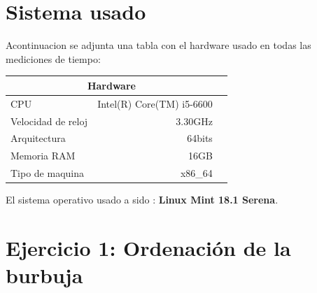 \documentclass[12pt,a4psprt]{article}
\title{\fbox{\fbox{\bf Práctica 1: Eficiencia}}}
\author{Antonio Jesús Heredia Castillo\\ 2ºA \\ ETS de Ingenierías Informática y de Telecomunicación }
\date{\today}
\begin{document}
\maketitle{}
	
\begin{abstract}
En esta practica obtendremos datos sobre el tiempo de ejecucion de distintos algoritmos y como afecta la compilacion al tiempo de ejecución.
\end{abstract}



\pagebreak
\tableofcontents
\pagebreak
\section{Sistema usado}
Acontinuacion se adjunta una tabla con el hardware usado en todas las mediciones de tiempo: \\
\begin{center}
\begin{tabular}{|l||r|p{2cm}}
\hline
\multicolumn{2}{|c|}{Hardware} \\
\hline
CPU & Intel(R) Core(TM) i5-6600 \\
\hline
Velocidad de reloj & 3.30GHz \\
\hline
Arquitectura & 64bits \\
\hline
Memoria RAM & 16GB \\
\hline
Tipo de maquina & x86\_64 \\
\hline

\end{tabular}
\end{center}

El sistema operativo usado a sido : \textbf{Linux Mint 18.1 Serena}.
\pagebreak
\section{Ejercicio 1: Ordenación de la burbuja}
\end{document}
